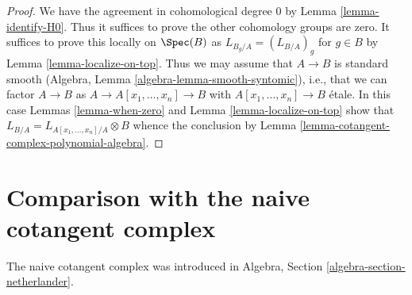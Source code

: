\begin{proof}
We have the agreement in cohomological degree $0$ by
Lemma \ref{lemma-identify-H0}.
Thus it suffices to prove the other cohomology groups
are zero. It suffices to prove this locally on $\Spec(B)$ as
$L_{B_g/A} = (L_{B/A})_g$ for $g \in B$ by Lemma \ref{lemma-localize-on-top}.
Thus we may assume that $A \to B$ is standard smooth
(Algebra, Lemma \ref{algebra-lemma-smooth-syntomic}), i.e.,
that we can factor $A \to B$ as
$A \to A[x_1, \ldots, x_n] \to B$ with $A[x_1, \ldots, x_n] \to B$
\'etale. In this case Lemmas \ref{lemma-when-zero} and
Lemma \ref{lemma-localize-on-top} show that
$L_{B/A} = L_{A[x_1, \ldots, x_n]/A} \otimes B$
whence the conclusion by
Lemma \ref{lemma-cotangent-complex-polynomial-algebra}.
\end{proof}





\section{Comparison with the naive cotangent complex}
\label{section-surjections}

\noindent
The naive cotangent complex was introduced in
Algebra, Section \ref{algebra-section-netherlander}.

